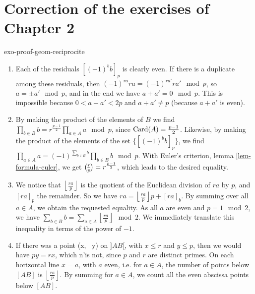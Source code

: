 \section{Correction of the exercises of Chapter 2}
 
 
\begin{correction}{exo-proof-geom-reciprocite}
\begin{enumerate}
\item Each of the residuals $ [(- 1)^bb]_p $ is clearly even. If there is a duplicate among these residuals, then $ (- 1)^{ra} ra = (-1)^{r a'} ra' \mod{p} $, so $ a = \pm a' \mod{p} $, and in the end we have $ a + a'= 0 \mod{p} $. This is impossible because $ 0 <a + a'<2 p $ and $ a + a' \neq p $ (because $ a + a'$ is even).
\item By making the product of the elements of $ B $ we find $ \prod_{b \in B}{b} = r^{\frac{p-1}{2}} \prod_{a \in A}{a} \mod{p} $, since $ \operatorname{Card} (A) = \frac{p-1}{2} $. Likewise, by making the product of the elements of the set $ \{[(-1)^bb]_p\} $, we find $ \prod_{a \in A}{a} = (-1)^{\sum_{b \in B}{b}} \prod_{b \in B}{b} \mod{p} $. With Euler's criterion, lemma \ref{lem-formula-euler}, we get $ \legsymb{r}{p} = r^{\frac{p-1}{2}} $, which leads to the desired equality.
\item We notice that $ \left\lfloor \frac{ra}{p} \right\rfloor $ is the quotient of the Euclidean division of $ ra $ by $ p $, and $ [ra]_p $ the remainder. So we have $ ra = \left\lfloor \frac{ra}{p} \right\rfloor p + [ra]_b $. By summing over all $ a \in A $, we obtain the requested equality. As all $ a $ are even and $ p = 1 \mod{2} $, we have $ \sum_{b \in B}{b} = \sum_{a \in A}{\left\lfloor \frac{ra}{p} \right\rfloor} \mod{2} $. We immediately translate this inequality in terms of the power of $ -1 $.
\item If there was a point (x, \, y) on $] AB [$, with $ x \leq r $ and $ y \leq p $, then we would have $ py = rx $, which n'is not, since $ p $ and $ r $ are distinct primes. On each horizontal line $ x = a $, with $ a $ even, i.e. for $ a \in A $, the number of points below $ [AB] $ is $ \left\lfloor \frac{ra}{p} \right\rfloor $. By summing for $ a \in A $, we count all the even abscissa points below $ [AB] $.

\end{enumerate}
\end{correction}
